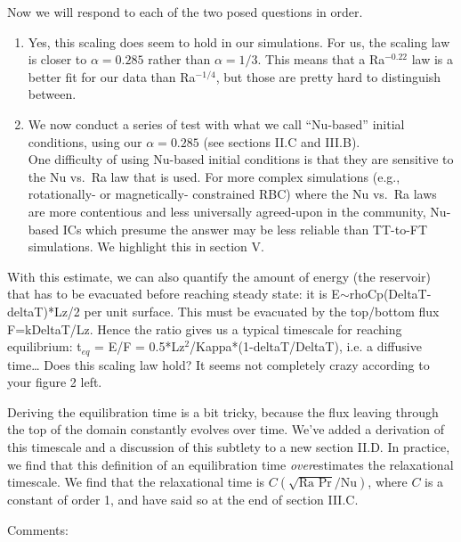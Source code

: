 \documentclass[aps, 11pt, singlecolumn]{revtex4-1} %
\begin{document}
\begin{singlespace}
Now we will respond to each of the two posed questions in order.
\begin{enumerate}
\item 
Yes, this scaling does seem to hold in our simulations.
For us, the scaling law is closer to $\alpha = 0.285$ rather than $\alpha = 1/3$.
This means that a Ra$^{-0.22}$ law is a better fit for our data than Ra$^{-1/4}$, but those are pretty hard to distinguish between.
\item 
We now conduct a series of test with what we call ``Nu-based'' initial conditions, using our $\alpha = 0.285$ (see sections II.C and III.B).
\vspace{0.5cm}
\\
One difficulty of using Nu-based initial conditions is that they are sensitive to the Nu vs.~Ra law that is used.
For more complex simulations (e.g., rotationally- or magnetically- constrained RBC) where the Nu vs.~Ra laws are more contentious and less universally agreed-upon in the community, Nu-based ICs which presume the answer may be less reliable than TT-to-FT simulations.
We highlight this in section V.
\end{enumerate}


\begin{myquotation}
With this estimate, we can also quantify the amount of energy (the reservoir) that has to be evacuated before reaching steady state: it is E$\sim$rhoCp(DeltaT-deltaT)*Lz/2 per unit surface. 
This must be evacuated by the top/bottom flux F=kDeltaT/Lz. 
Hence the ratio gives us a typical timescale for reaching equilibrium: t$_{eq}$ = E/F = 0.5*Lz$^2$/Kappa*(1-deltaT/DeltaT), i.e. a diffusive time…
Does this scaling law hold? It seems not completely crazy according to your figure 2 left.
\end{myquotation}
Deriving the equilibration time is a bit tricky, because the flux leaving through the top of the domain constantly evolves over time.
We've added a derivation of this timescale and a discussion of this subtlety to a new section II.D.
In practice, we find that this definition of an equilibration time \emph{over}estimates the relaxational timescale.
We find that the relaxational time is $C (\sqrt{\text{Ra Pr}}/\text{Nu})$, where $C$ is a constant of order 1, and have said so at the end of section III.C.

\begin{myquotation}
Comments:


\end{myquotation}
\end{singlespace}
\end{document}
